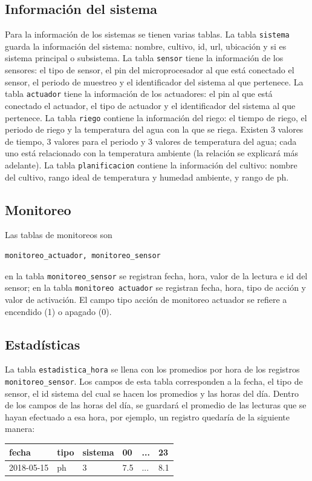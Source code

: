 \documentclass[a4paper,10pt,titlepage]{article}
\begin{document}
\subsection{Informaci\'on del sistema} 
Para la informaci\'on de los sistemas se tienen varias tablas. La tabla 
\verb|sistema| guarda la informaci\'on del sistema: nombre, cultivo, id, url, ubicaci\'on y si es sistema principal o subsistema. La 
tabla \verb|sensor| tiene la informaci\'on de los sensores: el tipo de sensor, 
el pin del microprocesador al que est\'a conectado el sensor, 
el periodo de muestreo y el identificador del sistema al que pertenece. La tabla \verb|actuador| tiene la informaci\'on de los actuadores: el pin al que est\'a conectado el 
actuador, 
el tipo de actuador y el identificador del sistema al que pertenece. La tabla \verb|riego| contiene la informaci\'on del
 riego: el tiempo de riego, el periodo de riego y la temperatura del agua con la que se riega. Existen 3 valores de tiempo, 3 valores para el periodo y 3 
valores de temperatura del agua; cada uno est\'a relacionado con la temperatura ambiente (la relaci\'on se explicar\'a m\'as adelante). La tabla 
\verb|planificacion| contiene 
la informaci\'on del cultivo: nombre del cultivo, rango ideal de 
temperatura y humedad ambiente, y rango de ph.

\subsection{Monitoreo}
Las tablas de monitoreos son 

\begin{verbatim}
monitoreo_actuador, monitoreo_sensor
\end{verbatim}

en la tabla \verb|monitoreo_sensor| se registran fecha, hora, valor de la lectura e id del sensor; 
en la tabla \verb|monitoreo actuador| se registran fecha, hora, tipo de acci\'on y valor 
de activaci\'on. El campo tipo acci\'on de monitoreo actuador se 
refiere a encendido (1) o apagado (0).

\subsection{Estad\'isticas}
La tabla \verb|estadistica_hora| se llena con los promedios por hora de los 
registros \verb|monitoreo_sensor|. Los campos de esta tabla corresponden a la fecha, el tipo de sensor, el id sistema del cual se hacen los promedios y las horas del d\'ia. 
Dentro de los campos de las horas del d\'ia, se guardar\'a el promedio de las lecturas que se hayan efectuado a esa hora, por ejemplo, un registro quedar\'ia de la siguiente 
manera:  
\begin{tabular}[h]{|l|l|l|l|l|l|}
        \hline
        fecha & tipo & sistema & 00 & ... & 23 \\ \hline
        2018-05-15 & ph & 3 & 7.5 & ... & 8.1 \\  \hline
\end{tabular}
\end{document}
